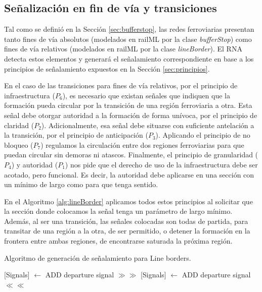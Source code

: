 \subsection{Señalización en fin de vía y transiciones}
    
	\label{sec:sig_border}
    

    Tal como se definió en la Sección \ref{sec:bufferstop}, las redes ferroviarias presentan tanto fines de vía absolutos (modelados en railML por la clase \textit{bufferStop}) como fines de vía relativos (modelados en railML por la clase \textit{lineBorder}). El RNA detecta estos elementos y generará el señalamiento correspondiente en base a los principios de señalamiento expuestos en la Sección \ref{sec:principios}.

    En el caso de las transiciones para fines de vía relativos, por el principio de infraestructura ($P_6$), es necesario que existan señales que indiquen que la formación pueda circular por la transición de una región ferroviaria a otra. Esta señal debe otorgar autoridad a la formación de forma unívoca, por el principio de claridad ($P_2$). Adicionalmente, esa señal debe situarse con suficiente antelación a la transición, por el principio de anticipación ($P_3$). Aplicando el principio de no bloqueo ($P_7$) regulamos la circulación entre dos regiones ferroviarias para que puedan circular sin demoras ni atascos. Finalmente, el principio de granularidad ($P_4$) y autoridad ($P_1$) nos pide que el derecho de uso de la infraestructura debe ser acotado, pero funcional. Es decir, la autoridad debe aplicarse en una sección con un mínimo de largo como para que tenga sentido. 

    En el Algoritmo \ref{alg:lineBorder} aplicamos todos estos principios al solicitar que la sección donde colocamos la señal tenga un parámetro de largo mínimo. Además, al ser una transición, las señales colocadas son todas de partida, para transitar de una región a la otra, de ser permitido, o detener la formación en la frontera entre ambas regiones, de encontrarse saturada la próxima región.
    
    \begin{algorithm}[H]
        \caption{Algoritmo de generación de señalamiento para Line borders.}\label{alg:lineBorder}
        \DontPrintSemicolon
        \SetNoFillComment
        \LinesNotNumbered 
        {
            {
                {
                    [Signals] $\gets$ ADD departure signal $\gg\gg$\;
                }
                {
                    [Signals] $\gets$ ADD departure signal $\ll\ll$\;
                }
            }
        }
        \KwResult{[Signals]} 
    \end{algorithm}

